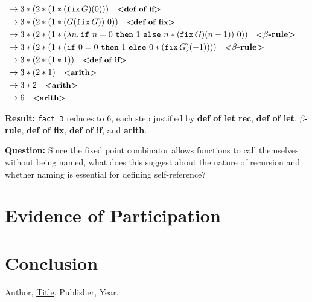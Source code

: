 \documentclass{article}
\theoremstyle{theorem}
\theoremstyle{definition}
\theoremstyle{remark}
\begin{document}
\[\begin{aligned}
\\
\to\;& 3 * (2 * (1 * (\texttt{fix}\,G)(0))) \quad \textbf{\small<def of if>}
\\
\to\;& 3 * (2 * (1 * (G(\texttt{fix}\,G))\ 0)) \quad \textbf{\small<def of fix>}
\\
\to\;& 3 * (2 * (1 * (\lambda n.\,\texttt{if}\ n=0\ \texttt{then}\ 1\ \texttt{else}\ n*(\texttt{fix}\,G)(n-1))\ 0)) \quad \textbf{\small<}\beta\textbf{-rule>}
\\
\to\;& 3 * (2 * (1 * (\texttt{if}\ 0=0\ \texttt{then}\ 1\ \texttt{else}\ 0*(\texttt{fix}\,G)(-1)))) \quad \textbf{\small<}\beta\textbf{-rule>}
\\
\to\;& 3 * (2 * (1 * 1)) \quad \textbf{\small<def of if>}
\\
\to\;& 3 * (2 * 1) \quad \textbf{\small<arith>}
\\
\to\;& 3 * 2 \quad \textbf{\small<arith>}
\\
\to\;& 6 \quad \textbf{\small<arith>}
\end{aligned}
\]

\textbf{Result:} \texttt{fact 3} reduces to $6$, each step justified by \textbf{def of let rec}, \textbf{def of let}, \(\beta\)\textbf{-rule}, \textbf{def of fix}, \textbf{def of if}, and \textbf{arith}.

\textbf{Question:} Since the fixed point combinator allows functions to call themselves without being named, what does this suggest about the nature of recursion and whether naming is essential for defining self-reference?

\section{Evidence of Participation}

\section{Conclusion}\label{conclusion}

\begin{thebibliography}{99}
 Author, \href{https://en.wikipedia.org/wiki/LaTeX}{Title}, Publisher, Year.
\end{thebibliography}
\end{document}

